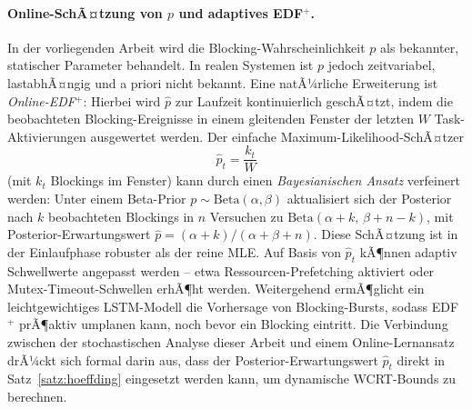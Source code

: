 ﻿\documentclass[a4paper,12pt]{article}
\theoremstyle{definition}
\begin{document}
	\paragraph{Online-SchÃ¤tzung von $p$ und adaptives EDF$^+$.}
	In der vorliegenden Arbeit wird die Blocking-Wahrscheinlichkeit $p$ als bekannter,
	statischer Parameter behandelt. In realen Systemen ist $p$ jedoch zeitvariabel,
	lastabhÃ¤ngig und a priori nicht bekannt. Eine natÃ¼rliche Erweiterung ist
	\emph{Online-EDF$^+$}: Hierbei wird $\hat{p}$ zur Laufzeit kontinuierlich geschÃ¤tzt,
	indem die beobachteten Blocking-Ereignisse in einem gleitenden Fenster der letzten $W$
	Task-Aktivierungen ausgewertet werden. Der einfache Maximum-Likelihood-SchÃ¤tzer
	\[
		\hat{p}_t = \frac{k_t}{W}
	\]
	(mit $k_t$ Blockings im Fenster) kann durch einen \emph{Bayesianischen Ansatz} verfeinert
	werden: Unter einem Beta-Prior $p \sim \mathrm{Beta}(\alpha, \beta)$ aktualisiert sich der
	Posterior nach $k$ beobachteten Blockings in $n$ Versuchen zu
	$\mathrm{Beta}(\alpha + k,\, \beta + n - k)$, mit Posterior-Erwartungswert
	$\hat{p} = (\alpha + k) / (\alpha + \beta + n)$.
	Diese SchÃ¤tzung ist in der Einlaufphase robuster als der reine MLE.
	Auf Basis von $\hat{p}_t$ kÃ¶nnen adaptiv Schwellwerte angepasst werden -- etwa
	Ressourcen-Prefetching aktiviert oder Mutex-Timeout-Schwellen erhÃ¶ht werden.
	Weitergehend ermÃ¶glicht ein leichtgewichtiges LSTM-Modell die Vorhersage von
	Blocking-Bursts, sodass EDF$^+$ prÃ¶aktiv umplanen kann, noch bevor ein Blocking
	eintritt. Die Verbindung zwischen der stochastischen Analyse dieser Arbeit und einem
	Online-Lernansatz drÃ¼ckt sich formal darin aus, dass der Posterior-Erwartungswert
	$\hat{p}_t$ direkt in Satz~\ref{satz:hoeffding} eingesetzt werden kann, um dynamische
	WCRT-Bounds zu berechnen.
\end{document}
